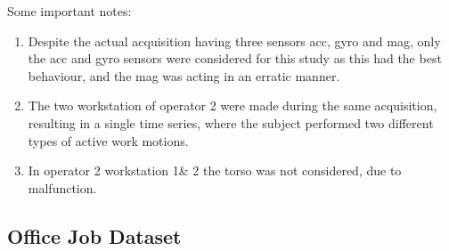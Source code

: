 Some important notes:
\begin{enumerate}
\item Despite the actual acquisition having three sensors \gls{acc}, \gls{gyro} and \gls{mag}, only the \gls{acc} and \gls{gyro} sensors were considered for this study as this had the best behaviour, and the \gls{mag} was acting in an erratic manner.
\item The two workstation of operator 2 were made during the same acquisition, resulting in a single time series, where the subject performed two different types of active work motions.
\item In operator 2 workstation 1\& 2 the torso was not considered, due to malfunction.
\end{enumerate}


\subsection{Office Job Dataset}
